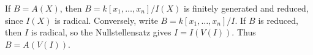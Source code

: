 If $B=A(X)$, then $B=k[x_1,\ldots,x_n]/I(X)$ is finitely generated and reduced, since $I(X)$ is radical. Conversely, write $B=k[x_1,\ldots,x_n]/I$. If $B$ is reduced, then $I$ is radical, so the Nullstellensatz gives $I=I(V(I))$. Thus $B=A(V(I))$.
